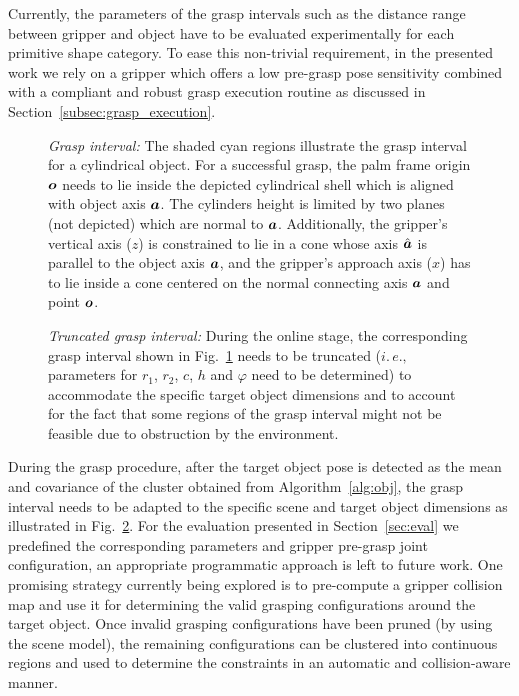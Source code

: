 Currently, the parameters of the grasp intervals such as the distance range between gripper and
object have to be evaluated experimentally for each primitive shape category. To ease this
non-trivial requirement, in the presented work we rely on a gripper which offers a low pre-grasp
pose sensitivity combined with a compliant and robust grasp execution routine as discussed in
Section~\ref{subsec:grasp_execution}.
%
\begin{figure}[t!] 
   \centering
     
    \caption{\textit{Grasp interval:} The shaded cyan regions illustrate the grasp interval for a
      cylindrical object. For a successful grasp, the palm frame origin $\mbox{\boldmath $o$}$ needs to lie
      inside the depicted cylindrical shell which is aligned with object axis $\mbox{\boldmath $a$}$. The
      cylinders height is limited by two planes (not depicted) which are normal to
      $\mbox{\boldmath $a$}$. Additionally, the gripper's vertical axis ($z$) is constrained to lie in a cone
      whose axis $\hat{\mbox{\boldmath $a$}}$ is parallel to the object axis $\mbox{\boldmath $a$}$, and the gripper's
      approach axis ($x$) has to lie inside a cone centered on the normal connecting axis $\mbox{\boldmath $a$}$
      and point $\mbox{\boldmath $o$}$.}
   \label{fig:grasp_interval}
   \vspace{-0.5cm}
\end{figure}
%
\begin{figure}[t!] 
   \centering
     
    \caption{\textit{Truncated grasp interval:} During the online stage, the corresponding grasp
      interval shown in Fig.~\ref{fig:grasp_interval} needs to be truncated ($i.\,e.,$ parameters
      for $r_1$, $r_2$, $c$, $h$ and $\varphi$ need to be determined) to accommodate the specific
      target object dimensions and to account for the fact that some regions of the grasp interval
      might not be feasible due to obstruction by the environment.}
   \label{fig:truncated_grasp_interval}
\end{figure}

During the grasp procedure, after the target object pose is detected as the mean and covariance of
the cluster obtained from Algorithm~\ref{alg:obj}, the grasp interval needs to be adapted to the
specific scene and target object dimensions as illustrated in
Fig.~\ref{fig:truncated_grasp_interval}. For the evaluation presented in Section~\ref{sec:eval} we
predefined the corresponding parameters and gripper pre-grasp joint configuration, an appropriate
programmatic approach is left to future work.  One promising strategy currently being explored is to
pre-compute a gripper collision map and use it for determining the valid grasping configurations
around the target object.  Once invalid grasping configurations have been pruned (by using the scene
model), the remaining configurations can be clustered into continuous regions and used to determine
the constraints in an automatic and collision-aware manner.
%
